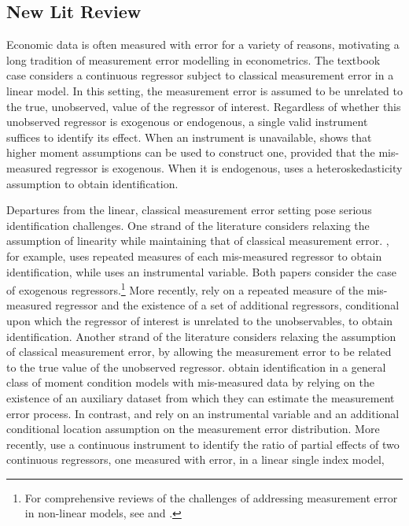 \subsection{New Lit Review}
Economic data is often measured with error for a variety of reasons, motivating a long tradition of measurement error modelling in econometrics. 
The textbook case considers a continuous regressor subject to classical measurement error in a linear model.
In this setting, the measurement error is assumed to be unrelated to the true, unobserved, value of the regressor of interest.
Regardless of whether this unobserved regressor is exogenous or endogenous, a single valid instrument suffices to identify its effect.
When an instrument is unavailable, \cite{lewbel1997} shows that higher moment assumptions can be used to construct one, provided that the mis-measured regressor is exogenous.
When it is endogenous, \cite{lewbel2012} uses a heteroskedasticity assumption to obtain identification.

Departures from the linear, classical measurement error setting pose serious identification challenges.
One strand of the literature considers relaxing the assumption of linearity while maintaining that of classical measurement error.
\cite{schennach2004}, for example, uses repeated measures of each mis-measured regressor to obtain identification, while \cite{schennach2007} uses an instrumental variable.  
Both papers consider the case of exogenous regressors.\footnote{For comprehensive reviews of the challenges of addressing measurement error in non-linear models, see  \cite{chensurvey} and \cite{SchennachSurvey}.}
More recently, \cite{SongSchennachWhite} rely on a repeated measure of the mis-measured regressor and the existence of a set of additional regressors, conditional upon which the regressor of interest is unrelated to the unobservables, to obtain identification.      
Another strand of the literature considers relaxing the assumption of classical measurement error, by allowing the measurement error to be related to the true value of the unobserved regressor.
\cite{ChenHongTamer} obtain identification in a general class of moment condition models with mis-measured data by relying on the existence of an auxiliary dataset from which they can estimate the measurement error process.
In contrast, \cite{HuSchennach} and \cite{song2015} rely on an instrumental variable and an additional conditional location assumption on the measurement error distribution. 
More recently, \cite{HuShiuWoutersen} use a continuous instrument to identify the ratio of partial effects of two continuous regressors, one measured with error, in a linear single index model, 

